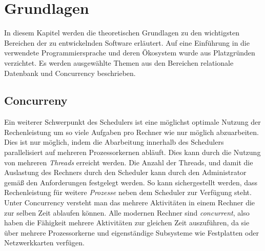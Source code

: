 \chapter{Grundlagen}\label{chap:Grundlagen}
\chapterstart
In diesem Kapitel werden die theoretischen Grundlagen zu den wichtigsten Bereichen der zu entwickelnden Software erläutert. Auf eine Einführung in die verwendete Programmiersprache und deren Ökosystem wurde aus Platzgründen verzichtet. Es werden ausgewählte Themen aus den Bereichen relationale Datenbank und Concurrency beschrieben.

\section{Concurreny}
Ein weiterer Schwerpunkt des Schedulers ist eine möglichst optimale Nutzung der Rechenleistung um so viele Aufgaben pro Rechner wie nur möglich abzuarbeiten. Dies ist nur möglich, indem die Abarbeitung innerhalb des Schedulers parallelisiert auf mehreren Prozessorkernen abläuft. Dies kann durch die Nutzung von mehreren \emph{Threads} erreicht werden. Die Anzahl der Threads, und damit die Auslastung des Rechners durch den Scheduler kann durch den Administrator gemäß den Anforderungen festgelegt werden. So kann sichergestellt werden, dass Rechenleistung für weitere \emph{Prozesse} neben dem Scheduler zur Verfügung steht.
\\Unter Concurrency versteht man das mehrere Aktivitäten in einem Rechner die zur selben Zeit ablaufen können. Alle modernen Rechner sind \emph{concurrent}, also haben die Fähigkeit mehrere Aktivitäten zur gleichen Zeit auszuführen, da sie über mehrere Prozessorkerne und eigenständige Subsysteme wie Festplatten oder Netzwerkkarten verfügen.\parencite{Anderson2014}
